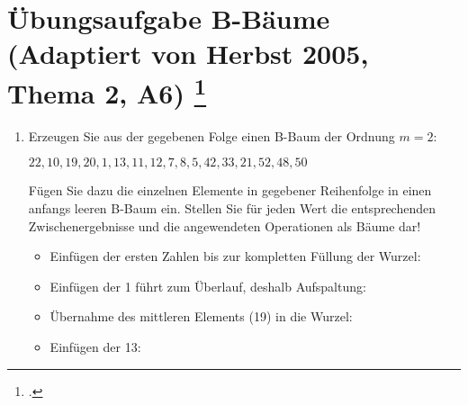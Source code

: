 \documentclass{lehramt-informatik}
\begin{document}
\section{Übungsaufgabe B-Bäume
(Adaptiert von Herbst 2005, Thema 2, A6)
\footcite[Seite 34-37(PDF 28-31)]{aud:fs:5}}

\begin{enumerate}


\item Erzeugen Sie aus der gegebenen Folge einen B-Baum der Ordnung
$m=2$:

$22,10,19,20,1,13,11,12,7,8,5,42,33,21,52,48,50$

Fügen Sie dazu die einzelnen Elemente in gegebener Reihenfolge in einen
anfangs leeren B-Baum ein. Stellen Sie für jeden Wert die entsprechenden
Zwischenergebnisse und die angewendeten Operationen als Bäume dar!

\begin{itemize}

%

\item {}    Einfügen der ersten
Zahlen bis zur kompletten Füllung der Wurzel:


%

\item {} Einfügen der 1 führt zum Überlauf, deshalb Aufspaltung:


%

\item Übernahme des mittleren Elements (19) in die Wurzel:


%

\item {} Einfügen der 13:


\end{itemize}
\end{enumerate}
\end{document}
